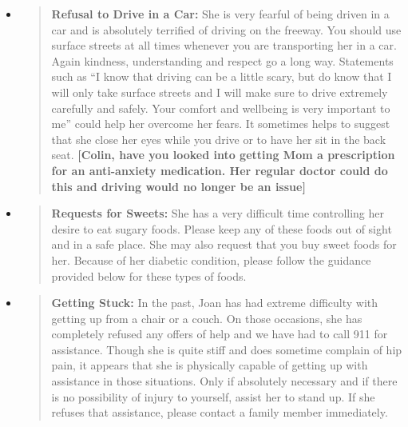 \documentclass[]{article}
\begin{document}
\begin{itemize}
\item
  \begin{quote}
  \textbf{Refusal to Drive in a Car:} She is very fearful of being
  driven in a car and is absolutely terrified of driving on the freeway.
  You should use surface streets at all times whenever you are
  transporting her in a car. Again kindness, understanding and respect
  go a long way. Statements such as ``I know that driving can be a
  little scary, but do know that I will only take surface streets and I
  will make sure to drive extremely carefully and safely. Your comfort
  and wellbeing is very important to me'' could help her overcome her
  fears. It sometimes helps to suggest that she close her eyes while you
  drive or to have her sit in the back seat. \textbf{{[}Colin, have you
  looked into getting Mom a prescription for an anti-anxiety medication.
  Her regular doctor could do this and driving would no longer be an
  issue{]}}
  \end{quote}
\end{itemize}

\begin{itemize}
\item
  \begin{quote}
  \textbf{Requests for Sweets:} She has a very difficult time
  controlling her desire to eat sugary foods. Please keep any of these
  foods out of sight and in a safe place. She may also request that you
  buy sweet foods for her. Because of her diabetic condition, please
  follow the guidance provided below for these types of foods.
  \end{quote}
\end{itemize}

\begin{itemize}
\item
  \begin{quote}
  \textbf{Getting Stuck:} In the past, Joan has had extreme difficulty
  with getting up from a chair or a couch. On those occasions, she has
  completely refused any offers of help and we have had to call 911 for
  assistance. Though she is quite stiff and does sometime complain of
  hip pain, it appears that she is physically capable of getting up with
  assistance in those situations. Only if absolutely necessary and if
  there is no possibility of injury to yourself, assist her to stand up.
  If she refuses that assistance, please contact a family member
  immediately.
  \end{quote}
\end{itemize}
\end{document}
